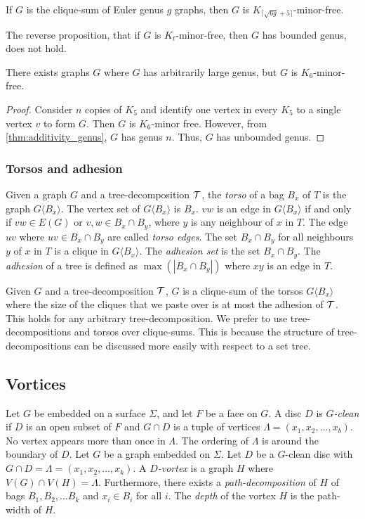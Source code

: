 \begin{corollary}\label{corr:clique_sum_genus}
	If \(G\) is the clique-sum of Euler genus \(g\) graphs, then \(G\) is \(K_{\lceil \sqrt{6g} + 5 \rceil}\)-minor-free.
\end{corollary}
The reverse proposition, that if $G$ is $K_t$-minor-free, then $G$ has bounded genus, does not hold.
\begin{proposition}
	There exists graphs $G$ where \(G\) has arbitrarily large genus, but $G$ is \(K_{6}\)-minor-free.
\end{proposition}

\begin{proof}
	Consider $n$ copies of $K_5$ and identify one vertex in every $K_5$ to a single vertex $v$ to form $G$. Then $G$ is $K_6$-minor free. However, from \cref{thm:additivity_genus}, $G$ has genus $n$. Thus, $G$ has unbounded genus. 
\end{proof}

\subsubsection{Torsos and adhesion}\label{sssec:Torsos and Adhesion}
Given a graph \(G\) and a tree-decomposition \(\mathcal{T}\), the \textit{torso} of a bag \(B_x\) of \(T\) is the graph \(G\langle B_x \rangle\). The vertex set of \(G\langle B_x \rangle\) is $B_x$. \(vw\) is an edge in \(G\langle B_x \rangle\) if and only if $vw \in E(G)$ or \(v,w \in B_x \cap B_y\), where \(y\) is any neighbour of \(x\) in \(T\). The edge $uv$ where $uv \in B_x \cap B_y$ are called \textit{torso edges}. The set \(B_x \cap B_y\) for all neighbours \(y\) of \(x\) in \(T\) is a clique in \(G\langle B_x \rangle\).
The \textit{adhesion set} is the set \(B_x \cap B_y\). 
The \textit{adhesion} of a tree is defined as \(\max(|B_x \cap B_y|)\) where \(xy\) is an edge in \(T\).

Given \(G\) and a tree-decomposition \(\mathcal{T}\), \(G\) is a clique-sum of the torsos \(G\langle B_x \rangle\) where the size of the cliques that we paste over is at most the adhesion of $\mathcal{T}$. This holds for any arbitrary tree-decomposition.
We prefer to use tree-decompositions and torsos over clique-sums. This is because the structure of tree-decompositions can be discussed more easily with respect to a set tree.

\subsection{Vortices}\label{sssec:vortices}
Let \(G\) be embedded on a surface \(\Sigma\), and let \(F\) be a face on \(G\). A disc $D$ is \textit{$G$-clean} if $D$ is an open subset of $F$ and $G \cap D$ is a tuple of vertices \(\Lambda = (x_1, x_2, \ldots, x_b)\). No vertex appears more than once in $\Lambda$. The ordering of $\Lambda$ is around the boundary of $D$. 
Let $G$ be a graph embedded on $\Sigma$. Let $D$ be a $G$-clean disc with $G \cap D = \Lambda = (x_1, x_2, \ldots, x_k)$. A \textit{$D$-vortex} is a graph $H$ where $V(G) \cap V(H) = \Lambda$. Furthermore, there exists a \textit{path-decomposition} of \(H\) of bags \(B_1, B_2, \ldots B_k\) and \(x_i \in B_i\) for all \(i\). The \textit{depth} of the vortex $H$ is the path-width of $H$. 

